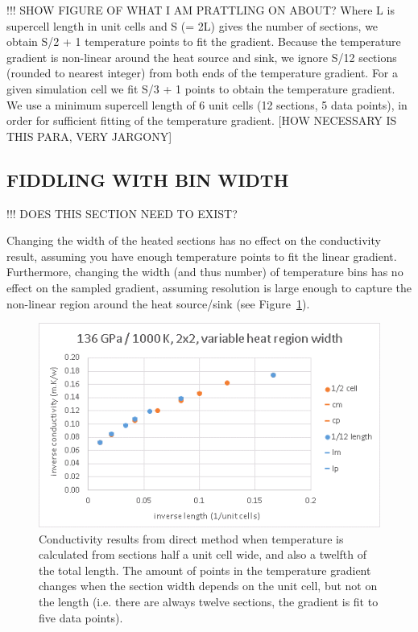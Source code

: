!!! SHOW FIGURE OF WHAT I AM PRATTLING ON ABOUT? Where L is supercell length in unit cells and S (= 2L) gives the number of sections, we obtain S/2 + 1 temperature points to fit the gradient. Because the temperature gradient is non-linear around the heat source and sink, we ignore S/12 sections (rounded to nearest integer) from both ends of the temperature gradient. For a given simulation cell we fit S/3 + 1 points to obtain the temperature gradient. We use a minimum supercell length of 6 unit cells (12 sections, 5 data points), in order for sufficient fitting of the temperature gradient. [HOW NECESSARY IS THIS PARA, VERY JARGONY]


\subsection{\label{sec:3.DM.bin}FIDDLING WITH BIN WIDTH}

!!! DOES THIS SECTION NEED TO EXIST?

Changing the width of the heated sections has no effect on the conductivity result, assuming you have enough temperature points to fit the linear gradient. Furthermore, changing the width (and thus number) of temperature bins has no effect on the sampled gradient, assuming resolution is large enough to capture the non-linear region around the heat source/sink (see Figure~\ref{fig:direct bin width}). 

\begin{figure}[h!]
\includegraphics[width=\linewidth]{Figures/direct_bin_width.png}
\caption[direct bin width]{Conductivity results from direct method when temperature is calculated from sections half a unit cell wide, and also a twelfth of the total length. The amount of points in the temperature gradient changes when the section width depends on the unit cell, but not on the length (i.e. there are always twelve sections, the gradient is fit to five data points).}
\label{fig:direct bin width}
\end{figure}


